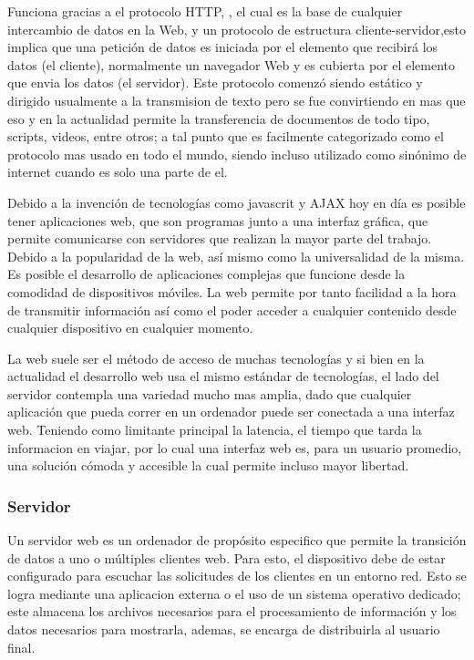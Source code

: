 Funciona gracias a el protocolo HTTP, ,
el cual es la base de cualquier intercambio de datos en la Web, y un protocolo
de estructura cliente-servidor,esto implica que una petición de datos es
iniciada por el elemento que recibirá los datos (el cliente), normalmente un
navegador Web y es cubierta por el elemento que envia los datos (el servidor).
Este protocolo comenzó siendo estático y dirigido usualmente a la transmision de
texto pero se fue convirtiendo en mas que eso y en la actualidad permite la
transferencia de documentos de todo tipo, scripts, videos, entre otros; a tal
punto que es facilmente categorizado como el protocolo mas usado en todo el
mundo, siendo incluso utilizado como sinónimo de internet cuando es solo una
parte de el.

Debido a la invención de tecnologías como javascrit y AJAX hoy en día es
posible tener aplicaciones web, que son programas junto a una interfaz gráfica,
que permite comunicarse con servidores que realizan la mayor parte del trabajo.
Debido a la popularidad de la web, así mismo como la  universalidad de la
misma. Es posible el desarrollo de aplicaciones complejas que funcione desde la
comodidad de dispositivos móviles. La web permite por tanto facilidad a la hora
de transmitir información así como el poder acceder a cualquier contenido desde
cualquier dispositivo en cualquier momento.

La web suele ser el método de acceso de muchas tecnologías y si bien en la actualidad
el desarrollo web usa el mismo estándar de tecnologías, el lado del servidor
contempla una variedad mucho mas amplia, dado que cualquier aplicación que
pueda correr en un ordenador puede ser conectada a una interfaz web. Teniendo
como limitante principal la latencia, el tiempo que tarda la informacion en viajar,
por lo cual una interfaz web es, para un usuario promedio, una solución cómoda y
accesible la cual  permite incluso  mayor libertad.


\subsubsection*{Servidor}

Un servidor web es un ordenador de propósito especifico que permite la
transición de datos a uno o múltiples clientes web. Para esto, el dispositivo
debe de estar configurado para escuchar las solicitudes de los clientes en un
entorno red. Esto se logra mediante una aplicacion externa o el uso de un
sistema operativo dedicado; este almacena los archivos
necesarios para el procesamiento de información y los datos necesarios para
mostrarla, ademas, se encarga de distribuirla al usuario final.

